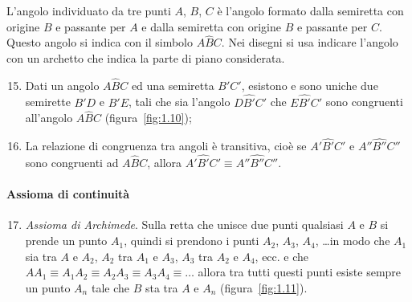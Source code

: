 L'angolo individuato da tre punti \(A\), \(B\), \(C\) è l'angolo formato 
dalla semiretta con origine \(B\) e passante per \(A\) e dalla semiretta 
con origine \(B\) e passante per \(C\). Questo angolo si indica con il 
simbolo \(A\widehat{B}C\). Nei disegni si usa indicare l'angolo con un 
archetto che indica la parte di piano considerata.

\begin{enumerate}[label=\Roman{*}.]
\setcounter{enumi}{14}
\item Dati un angolo \(A\widehat{B}C\) ed una semiretta \(B'C'\), 
esistono e sono uniche due semirette \(B'D\) e \(B'E\), tali che sia 
l'angolo \(D\widehat{B'}C'\) che \(E\widehat{B'}C'\) sono congruenti 
all'angolo \(A\widehat{B}C\) (figura~\ref{fig:1.10});

\begin{inaccessibleblock}
 \begin{center} \end{center}
\end{inaccessibleblock}
\item La relazione di congruenza tra angoli è transitiva, cioè se  
\(A'\widehat{B'}C'\) e  \(A''\widehat{B''}C''\) sono congruenti ad 
\(A\widehat{B}C\), allora  \(A'\widehat{B'}C' \equiv 
A''\widehat{B''}C''\).
\end{enumerate}

\paragraph{Assioma di continuità}

\begin{enumerate}[label=\Roman{*}., nosep]
\setcounter{enumi}{16}
\item \emph{Assioma di Archimede}. Sulla retta che unisce due punti 
qualsiasi \(A\) e \(B\) si prende un punto \(A_1\), quindi si prendono i 
punti \(A_2\), \(A_3\), \(A_4\), \ldots in modo che \(A_1\) sia tra \(A\) e 
\(A_2\), \(A_2\) tra \(A_1\) e \(A_3\), \(A_3\) tra \(A_2\) e \(A_4\), ecc. e che  
\(AA_1\equiv A_1A_2\equiv A_2A_3\equiv A_3A_4\equiv\ldots\) allora tra 
tutti questi punti esiste sempre un punto \(A_n\) tale che \(B\) sta tra 
\(A\) e \(A_n\) (figura~\ref{fig:1.11}).

\begin{inaccessibleblock}
 \begin{center} \end{center}
\end{inaccessibleblock}
\end{enumerate}

